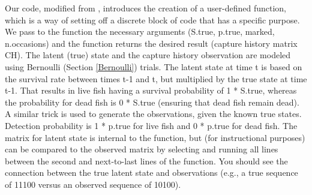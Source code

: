 \documentclass[
]{krantz}
\begin{document}
Our code, modified from \citet{kéry.schaub_2011}, introduces the creation of a user-defined function, which is a way of setting off a discrete block of code that has a specific purpose. We pass to the function the necessary arguments (S.true, p.true, marked, n.occasions) and the function returns the desired result (capture history matrix CH). The latent (true) state and the capture history observation are modeled using Bernoulli (Section \ref{Bernoulli}) trials. The latent state at time t is based on the survival rate between times t-1 and t, but multiplied by the true state at time t-1. That results in live fish having a survival probability of 1 * S.true, whereas the probability for dead fish is 0 * S.true (ensuring that dead fish remain dead). A similar trick is used to generate the observations, given the known true states. Detection probability is 1 * p.true for live fish and 0 * p.true for dead fish. The matrix for latent state is internal to the function, but (for instructional purposes) can be compared to the observed matrix by selecting and running all lines between the second and next-to-last lines of the function. You should see the connection between the true latent state and observations (e.g., a true sequence of 11100 versus an observed sequence of 10100).
\end{document}
